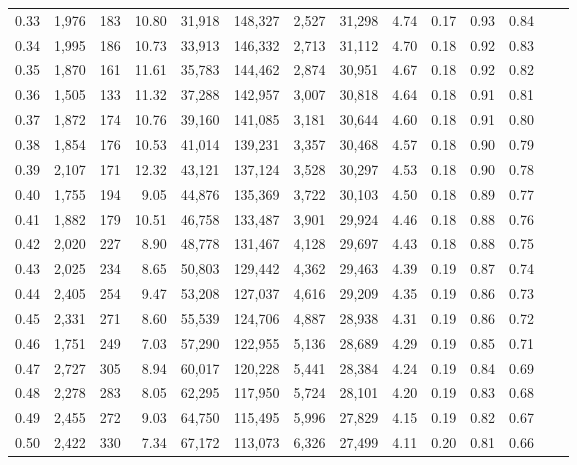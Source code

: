 \begin{tabular}{rrrrrrrrrrrrrr}
0.33 &  1,976 &  183 &   10.80 &   31,918 &  148,327 &   2,527 &  31,298 &  4.74 &  0.17 &  0.93 &      0.84 \\
0.34 &  1,995 &  186 &   10.73 &   33,913 &  146,332 &   2,713 &  31,112 &  4.70 &  0.18 &  0.92 &      0.83 \\
0.35 &  1,870 &  161 &   11.61 &   35,783 &  144,462 &   2,874 &  30,951 &  4.67 &  0.18 &  0.92 &      0.82 \\
0.36 &  1,505 &  133 &   11.32 &   37,288 &  142,957 &   3,007 &  30,818 &  4.64 &  0.18 &  0.91 &      0.81 \\
0.37 &  1,872 &  174 &   10.76 &   39,160 &  141,085 &   3,181 &  30,644 &  4.60 &  0.18 &  0.91 &      0.80 \\
0.38 &  1,854 &  176 &   10.53 &   41,014 &  139,231 &   3,357 &  30,468 &  4.57 &  0.18 &  0.90 &      0.79 \\
0.39 &  2,107 &  171 &   12.32 &   43,121 &  137,124 &   3,528 &  30,297 &  4.53 &  0.18 &  0.90 &      0.78 \\
0.40 &  1,755 &  194 &    9.05 &   44,876 &  135,369 &   3,722 &  30,103 &  4.50 &  0.18 &  0.89 &      0.77 \\
0.41 &  1,882 &  179 &   10.51 &   46,758 &  133,487 &   3,901 &  29,924 &  4.46 &  0.18 &  0.88 &      0.76 \\
0.42 &  2,020 &  227 &    8.90 &   48,778 &  131,467 &   4,128 &  29,697 &  4.43 &  0.18 &  0.88 &      0.75 \\
0.43 &  2,025 &  234 &    8.65 &   50,803 &  129,442 &   4,362 &  29,463 &  4.39 &  0.19 &  0.87 &      0.74 \\
0.44 &  2,405 &  254 &    9.47 &   53,208 &  127,037 &   4,616 &  29,209 &  4.35 &  0.19 &  0.86 &      0.73 \\
0.45 &  2,331 &  271 &    8.60 &   55,539 &  124,706 &   4,887 &  28,938 &  4.31 &  0.19 &  0.86 &      0.72 \\
0.46 &  1,751 &  249 &    7.03 &   57,290 &  122,955 &   5,136 &  28,689 &  4.29 &  0.19 &  0.85 &      0.71 \\
0.47 &  2,727 &  305 &    8.94 &   60,017 &  120,228 &   5,441 &  28,384 &  4.24 &  0.19 &  0.84 &      0.69 \\
0.48 &  2,278 &  283 &    8.05 &   62,295 &  117,950 &   5,724 &  28,101 &  4.20 &  0.19 &  0.83 &      0.68 \\
0.49 &  2,455 &  272 &    9.03 &   64,750 &  115,495 &   5,996 &  27,829 &  4.15 &  0.19 &  0.82 &      0.67 \\
0.50 &  2,422 &  330 &    7.34 &   67,172 &  113,073 &   6,326 &  27,499 &  4.11 &  0.20 &  0.81 &      0.66 \\

\end{tabular}
